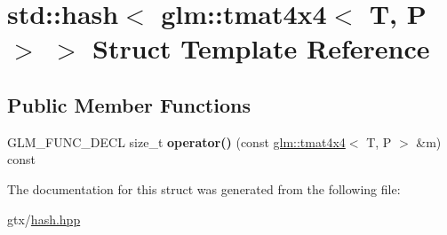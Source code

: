 \hypertarget{structstd_1_1hash_3_01glm_1_1tmat4x4_3_01T_00_01P_01_4_01_4}{\section{std\-:\-:hash$<$ glm\-:\-:tmat4x4$<$ T, P $>$ $>$ Struct Template Reference}
\label{structstd_1_1hash_3_01glm_1_1tmat4x4_3_01T_00_01P_01_4_01_4}
}
\subsection*{Public Member Functions}
\begin{DoxyCompactItemize}
\item 
\hypertarget{structstd_1_1hash_3_01glm_1_1tmat4x4_3_01T_00_01P_01_4_01_4_a04917cfefc4ef986804a6d544331ccf9}{G\-L\-M\-\_\-\-F\-U\-N\-C\-\_\-\-D\-E\-C\-L size\-\_\-t {\bfseries operator()} (const \hyperlink{structglm_1_1tmat4x4}{glm\-::tmat4x4}$<$ T, P $>$ \&m) const }\label{structstd_1_1hash_3_01glm_1_1tmat4x4_3_01T_00_01P_01_4_01_4_a04917cfefc4ef986804a6d544331ccf9}

\end{DoxyCompactItemize}


The documentation for this struct was generated from the following file\-:\begin{DoxyCompactItemize}
\item 
gtx/\hyperlink{hash_8hpp}{hash.\-hpp}\end{DoxyCompactItemize}
